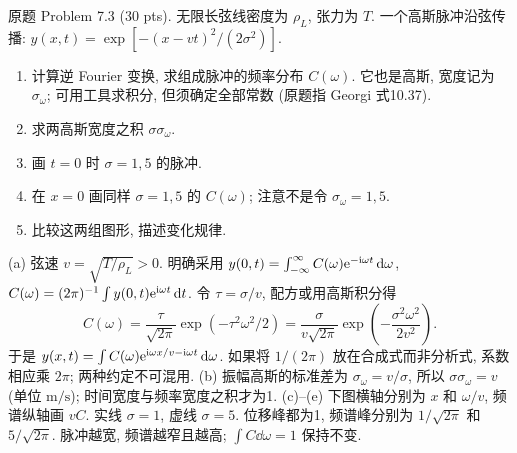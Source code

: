 \begin{exercise}\label{ps:7.3}
原题 Problem 7.3 (30 pts). 无限长弦线密度为 $\rho_L$, 张力为 $T$. 一个高斯脉冲沿弦传播:
$y(x,t)=\exp[-(x-vt)^2/(2\sigma^2)]$.
\begin{enumerate}[label=\alph*.]
\item 计算逆 Fourier 变换, 求组成脉冲的频率分布 $C(\omega)$. 它也是高斯, 宽度记为 $\sigma_\omega$; 可用工具求积分, 但须确定全部常数 (原题指 Georgi 式10.37).
\item 求两高斯宽度之积 $\sigma\sigma_\omega$.
\item 画 $t=0$ 时 $\sigma=1,5$ 的脉冲.
\item 在 $x=0$ 画同样 $\sigma=1,5$ 的 $C(\omega)$; 注意不是令 $\sigma_\omega=1,5$.
\item 比较这两组图形, 描述变化规律.
\end{enumerate}
\end{exercise}
\begin{solution}
(a) 弦速 $v=\sqrt{T/\rho_L}>0$. 明确采用
$y(0,t)=\int_{-\infty}^{\infty}C(\omega)\mathrm e^{-\mathrm i\omega t}\,\mathrm d\omega$,
$C(\omega)=(2\pi)^{-1}\int y(0,t)\mathrm e^{\mathrm i\omega t}\,\mathrm d t$.
令 $\tau=\sigma/v$, 配方或用高斯积分得
\[
C(\omega)=\frac{\tau}{\sqrt{2\pi}}\exp(-\tau^2\omega^2/2)
=\frac{\sigma}{v\sqrt{2\pi}}\exp\left(-\frac{\sigma^2\omega^2}{2v^2}\right).
\]
于是 $y(x,t)=\int C(\omega)\mathrm e^{\mathrm i\omega x/v-\mathrm i\omega t}\,\mathrm d\omega$. 如果将 $1/(2\pi)$ 放在合成式而非分析式, 系数相应乘 $2\pi$; 两种约定不可混用.
(b) 振幅高斯的标准差为 $\sigma_\omega=v/\sigma$, 所以 $\sigma\sigma_\omega=v$ (单位 $\mathrm{m/s}$); 时间宽度与频率宽度之积才为1.
(c)--(e) 下图横轴分别为 $x$ 和 $\omega/v$, 频谱纵轴画 $vC$. 实线 $\sigma=1$, 虚线 $\sigma=5$. 位移峰都为1, 频谱峰分别为 $1/\sqrt{2\pi}$ 和 $5/\sqrt{2\pi}$. 脉冲越宽, 频谱越窄且越高; $\int C\dd\omega=1$ 保持不变.
\begin{center}\quad
{}\end{center}
\end{solution}

